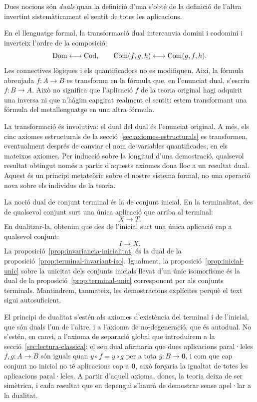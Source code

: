 \begin{observacio}\label{obs:dualitat}
Dues nocions són \emph{duals} quan la definició d'una s'obté de la definició de l'altra invertint sistemàticament el sentit de totes les aplicacions.

En el llenguatge formal, la transformació dual intercanvia domini i codomini i inverteix l'ordre de la composició:
\[
\operatorname{Dom}\longleftrightarrow\operatorname{Cod},
\qquad
\operatorname{Com}(f,g,h)\longleftrightarrow\operatorname{Com}(g,f,h).
\]
Les connectives lògiques i els quantificadors no es modifiquen. Així, la fórmula abreujada \(f:A\to B\) es transforma en la fórmula que, en l'enunciat dual, s'escriu \(f:B\to A\). Això no significa que l'aplicació \(f\) de la teoria original hagi adquirit una inversa ni que n'hàgim capgirat realment el sentit: estem transformant una fórmula del metallenguatge en una altra fórmula.

La transformació és involutiva: el dual del dual és l'enunciat original. A més, els cinc axiomes estructurals de la secció~\ref{sec:axiomes-estructurals} es transformen, eventualment després de canviar el nom de variables quantificades, en els mateixos axiomes. Per inducció sobre la longitud d'una demostració, qualsevol resultat obtingut només a partir d'aquests axiomes dona lloc a un resultat dual. Aquest és un principi metateòric sobre el nostre sistema formal, no una operació nova sobre els individus de la teoria.

La noció dual de conjunt terminal és la de conjunt inicial. En la terminalitat, des de qualsevol conjunt surt una única aplicació que arriba al terminal:
\[
X\longrightarrow T.
\]
En dualitzar-la, obtenim que des de l'inicial surt una única aplicació cap a qualsevol conjunt:
\[
I\longrightarrow X.
\]
La proposició~\ref{prop:invariancia-inicialitat} és la dual de
la proposició~\ref{prop:terminal-invariant-iso}. Igualment, la
proposició~\ref{prop:inicial-unic} sobre la unicitat dels conjunts inicials llevat d'un
únic isomorfisme és la dual de la proposició~\ref{prop:terminal-unic} corresponent per als
conjunts terminals. Mantindrem, tanmateix, les demostracions
explícites perquè el text sigui autosuficient.

El principi de dualitat s'estén als axiomes d'existència del terminal i de l'inicial, que són duals l'un de l'altre, i a l'axioma de no-degeneració, que és autodual. No s'estén, en canvi, a l'axioma de separació global que introduirem a la secció~\ref{sec:lectura-classica}: el seu dual afirmaria que dues aplicacions paral·leles \(f,g\colon A\to B\) són iguals quan \(y\circ f=y\circ g\) per a tota \(y\colon B\to\mathbf0\), i com que cap conjunt no inicial no té aplicacions cap a \(\mathbf0\), això forçaria la igualtat de totes les aplicacions paral·leles. A partir d'aquell axioma, doncs, la teoria deixa de ser simètrica, i cada resultat que en depengui s'haurà de demostrar sense apel·lar a la dualitat.
\end{observacio}

